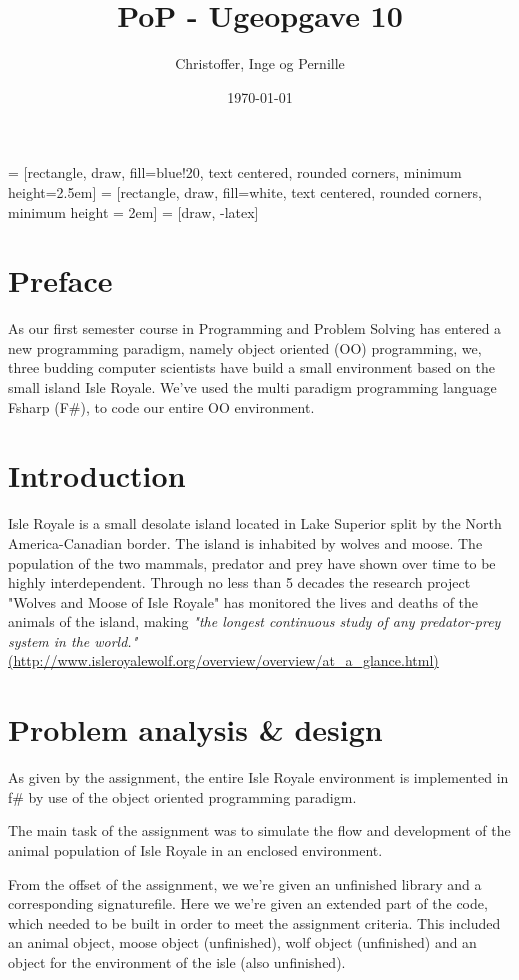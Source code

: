 \documentclass[a4paper]{report}
\title{PoP - Ugeopgave 10}
\author{Christoffer, Inge og Pernille}
\date{\today}
\begin{document}
\maketitle
{} = [rectangle, draw, fill=blue!20, text centered,
    rounded corners, minimum height=2.5em]
 = [rectangle, draw, fill=white, text centered,
    rounded corners, minimum height = 2em]
 = [draw, -latex]


\tableofcontents
\newpage

\section{Preface}
As our first semester course in Programming and Problem Solving has entered a new programming paradigm, namely object oriented (OO) programming, we, three budding computer scientists have build a small environment based on the small island Isle Royale. We've used the multi paradigm programming language Fsharp (F\#), to code our entire OO environment.

\section{Introduction}
Isle Royale is a small desolate island located in Lake Superior split by the North America-Canadian border. The island is inhabited by wolves and moose. The population of the two mammals, predator and prey have shown over time to be highly interdependent.
Through no less than 5 decades the research project "Wolves and Moose of Isle Royale" has monitored the lives and deaths of the animals of the island, making \textit{"the longest continuous study of any predator-prey system in the world."} \url{(http://www.isleroyalewolf.org/overview/overview/at_a_glance.html)}



\section{Problem analysis \& design}
As given by the assignment, the entire Isle Royale environment is implemented in f\# by use of the object oriented programming paradigm.

The main task of the assignment was to simulate the flow and development of the animal population of Isle Royale in an enclosed environment.

From the offset of the assignment, we we're given an unfinished library and a corresponding signaturefile.
Here we we're given an extended part of the code, which needed to be built in order to meet the assignment criteria.
This included an animal object, moose object (unfinished), wolf object (unfinished) and an object for the environment of the isle (also unfinished).
\end{document}
